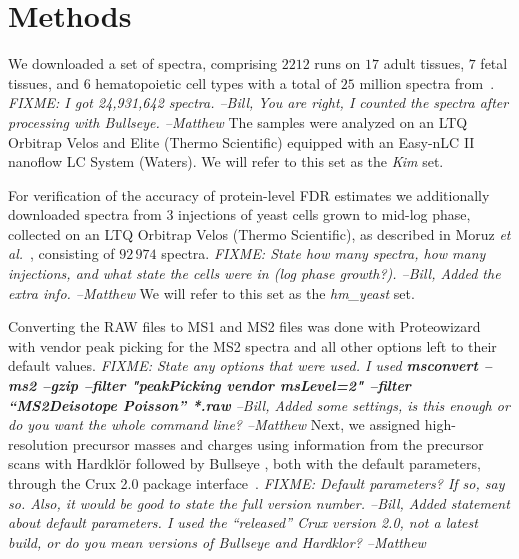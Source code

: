 \documentclass{article}
\begin{document}
\section*{Methods}

We downloaded a set of spectra, comprising $2212$ runs on $17$ adult
tissues, $7$ fetal tissues, and $6$ hematopoietic cell types with a
total of $25$ million spectra from~\cite{kim2014draft}. {\em FIXME: I
  got 24,931,642 spectra. --Bill, You are right, I counted the
spectra after processing with Bullseye. --Matthew} The
samples were analyzed on an LTQ Orbitrap Velos and Elite
(Thermo Scientific) equipped with an Easy-nLC II nanoflow LC System
(Waters). We will refer to this set as the {\em Kim} set.

For verification of the accuracy of protein-level FDR estimates we
additionally downloaded spectra from $3$ injections of yeast cells
grown to mid-log phase, collected on an LTQ Orbitrap Velos (Thermo
Scientific), as described in Moruz {\em et al.}~\cite{moruz2013},
consisting of $92\,974$ spectra. {\em FIXME: State how many spectra,
how many injections, and what state the cells were in (log phase
growth?). --Bill, Added the extra info. --Matthew} We will refer to
this set as the {\em hm\_yeast} set.

Converting the RAW files to MS1 and MS2 files was done with
Proteowizard~\cite{kessner2008} with vendor peak picking for the MS2
spectra and all other options left to their default values. {\em
FIXME: State any options that were used.  I used {\bf msconvert --ms2
--gzip --filter "peakPicking vendor msLevel=2" --filter ``MS2Deisotope
Poisson'' *.raw} --Bill, Added some settings, is this enough or do you
want the whole command line? --Matthew} Next, we assigned
high-resolution precursor masses and charges using information from
the precursor scans with Hardkl\"{o}r \cite{hoopmann2007} followed by
Bullseye \cite{hsieh2009}, both with the default parameters, through
the Crux 2.0 package interface~\cite{mcilwain2014}.  {\em FIXME:
Default parameters?  If so, say so.  Also, it would be good to state
the full version number. --Bill, Added statement about default
parameters. I used the ``released'' Crux version 2.0, not a latest
build, or do you mean versions of Bullseye and Hardklor? --Matthew}
\end{document}
